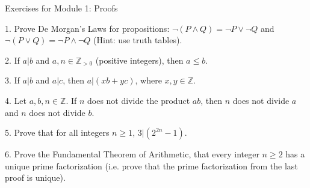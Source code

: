 \documentclass{article}
\theoremstyle{remark} %
\newcommand{\Z}{{\mathbb{Z}}}
\begin{document}
\begin{center}
\Large{Exercises for Module 1: Proofs}
\end{center}


1.  Prove De Morgan's Laws for propositions: $\neg (P \wedge Q) = \neg P \vee \neg Q$ and $\neg (P \vee Q) = \neg P \wedge \neg Q$ (Hint: use truth tables).

\vspace{11cm} %




2. If $a | b$ and $a,n \in \Z_{>0}$ (positive integers), then $a \leq b$.

\vspace{11cm} %



3. If $a | b$ and $a | c$, then $a | (x b + y c)$, where $x,y \in \Z$.

\vspace{11cm} %




4. Let $a,b,n \in \Z$. If $n$ does not divide the product $ab$, then $n$ does not divide $a$ and $n$ does not divide $b$.

\vspace{11cm} %




5. Prove that for all integers $n \geq 1$, $3|(2^{2n}-1)$.

\vspace{11cm} %




6. Prove the Fundamental Theorem of Arithmetic, that every integer $n \geq 2$ has a unique prime factorization (i.e. prove that the prime factorization from the last proof is unique).

\vspace{11cm} %

\end{document}
